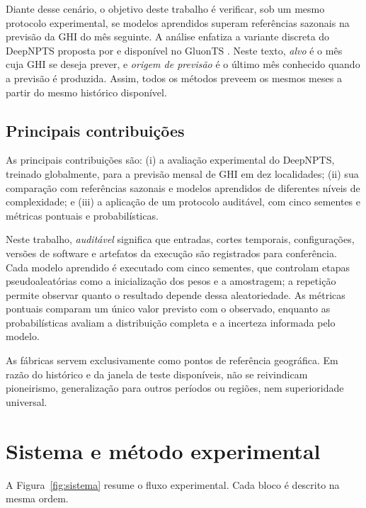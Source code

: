 \documentclass[12pt,a4paper,fleqn]{article}
\begin{document}
Diante desse cenário, o objetivo deste trabalho é verificar, sob um mesmo protocolo experimental, se modelos aprendidos superam referências sazonais na previsão da GHI do mês seguinte. A análise enfatiza a variante discreta do DeepNPTS proposta por \citet{rangapuram2023} e disponível no GluonTS \citep{alexandrov2020}. Neste texto, \textit{alvo} é o mês cuja GHI se deseja prever, e \textit{origem de previsão} é o último mês conhecido quando a previsão é produzida. Assim, todos os métodos preveem os mesmos meses a partir do mesmo histórico disponível.

\subsection{Principais contribuições}

As principais contribuições são: (i) a avaliação experimental do DeepNPTS, treinado globalmente, para a previsão mensal de GHI em dez localidades; (ii) sua comparação com referências sazonais e modelos aprendidos de diferentes níveis de complexidade; e (iii) a aplicação de um protocolo auditável, com cinco sementes e métricas pontuais e probabilísticas.

Neste trabalho, \textit{auditável} significa que entradas, cortes temporais, configurações, versões de software e artefatos da execução são registrados para conferência. Cada modelo aprendido é executado com cinco sementes, que controlam etapas pseudoaleatórias como a inicialização dos pesos e a amostragem; a repetição permite observar quanto o resultado depende dessa aleatoriedade. As métricas pontuais comparam um único valor previsto com o observado, enquanto as probabilísticas avaliam a distribuição completa e a incerteza informada pelo modelo.

As fábricas servem exclusivamente como pontos de referência geográfica. Em razão do histórico e da janela de teste disponíveis, não se reivindicam pioneirismo, generalização para outros períodos ou regiões, nem superioridade universal.

\section{Sistema e método experimental}
\label{sec:metodo}

A Figura~\ref{fig:sistema} resume o fluxo experimental. Cada bloco é descrito na mesma ordem.
\end{document}
